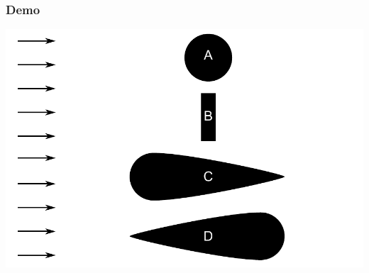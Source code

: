 \documentclass[t]{beamer}
\begin{document}
  	\begin{frame}
		\frametitle{Demo}
		\center
    	\includegraphics[height=0.8\textheight]{../fig/uitwendige_stroming/Invloed_van_vorm_op_weerstand}
  	\end{frame}
\end{document}
